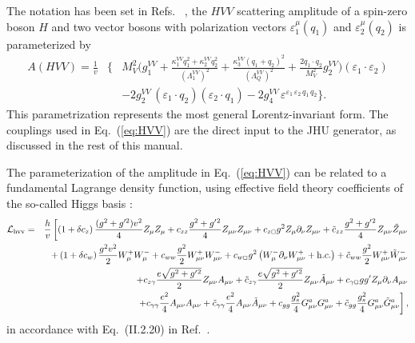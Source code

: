 \documentclass[aps,superscriptaddress,nofootinbib]{revtex4}
\begin{document}
The notation has been set in Refs.~\cite{Gao:2010qx,Bolognesi:2012,Anderson:2013,Gritsan:2016} ,
the $HVV$ scattering amplitude of a spin-zero boson $H$ and two vector bosons with polarization vectors 
$\varepsilon_{1}^\mu(q_1)$ and $\varepsilon_{2}^\mu(q_2)$
is parameterized by
\begin{eqnarray}
  A({H V V}) \!=\! \frac{1}{v} &\bigg\{  &
                          M_V^2 \bigg(g_{1}^{VV} 
+ \frac{\kappa_1^{VV}q_{1}^2 + \kappa_2^{VV} q_{2}^{2}}{\left(\Lambda_{1}^{VV} \right)^{2}} + \frac{\kappa_3^{VV} (q_1+q_2)^2}{\left(\Lambda_{Q}^{VV} \right)^{2}} 
+ \frac{2 q_1\cdot q_2}{M_V^2} g_2^{VV}\bigg) (\varepsilon_1 \cdot \varepsilon_2) 
\nonumber \\ &&
                        -2 g_2^{VV} \, {(\varepsilon_1 \cdot q_2)(\varepsilon_2 \cdot q_1)}
                        -2  g_4^{VV} \, {\varepsilon^{\varepsilon_1\,\varepsilon_2\,q_1\,q_2}}
                               \bigg\}.
\label{eq:HVV}
\end{eqnarray}
This parametrization represents the most general Lorentz-invariant form. 
The couplings used in Eq.~(\ref{eq:HVV}) are the direct input to the JHU generator, as discussed
in the rest of this manual. 

The parameterization of the amplitude in Eq.~(\ref{eq:HVV}) can be related to a fundamental Lagrange density function,
using effective field theory coefficients of the so-called Higgs basis \cite{deFlorian:2016spz}:
\begin{eqnarray}
\label{eq:EFT_hvv}
 {\cal L}_{\rm hvv} =& & {h \over v} \left [ 
  \left (1 +  \delta c_z \right )  {(g^2+g^{\prime 2}) v^2 \over 4} Z_\mu Z_\mu
+ c_{zz} {g^2 + g'{}^2 \over  4} Z_{\mu \nu} Z_{\mu\nu}  
+c_{z \Box} g^2 Z_\mu \partial_\nu Z_{\mu \nu}
+ \tilde c_{zz}  {g^2 + g'{}^2  \over  4} Z_{\mu \nu} \tilde Z_{\mu\nu}
\right . \nonumber \\ & & \left . 
% 
% 
 +\left (1 +  \delta c_w \right )  {g^2 v^2 \over 2} W_\mu^+ W_\mu^- 
+ c_{ww}  {g^2 \over  2} W_{\mu \nu}^+  W_{\mu\nu}^- 
+ c_{w \Box} g^2 \left (W_\mu^- \partial_\nu W_{\mu \nu}^+ + {\mathrm h.c.} \right )  
 + \tilde c_{ww}  {g^2 \over  2} W_{\mu \nu}^+   \tilde W_{\mu\nu}^- 
 \right . \nonumber \\ & & \left . 
% 
% 
+ c_{z \gamma} {e \sqrt{g^2 + g'{}^2}  \over  2} Z_{\mu \nu} A_{\mu\nu} 
+ \tilde c_{z \gamma} {e \sqrt{g^2 + g'{}^2} \over  2} Z_{\mu \nu} \tilde A_{\mu\nu}
+ c_{\gamma \Box} g g' Z_\mu \partial_\nu A_{\mu \nu}
\right . \nonumber \\ & & \left . 
% 
% 
+ c_{\gamma \gamma} {e^2 \over 4} A_{\mu \nu} A_{\mu \nu} 
+ \tilde c_{\gamma \gamma} {e^2 \over 4} A_{\mu \nu} \tilde A_{\mu \nu} 
+  c_{gg} {g_s^2 \over 4 } G_{\mu \nu}^a G_{\mu \nu}^a   
+  \tilde c_{gg} {g_s^2 \over 4} G_{\mu \nu}^a \tilde G_{\mu \nu}^a  
\right ],
\end{eqnarray} 
in accordance with Eq.~(II.2.20) in Ref.~\cite{deFlorian:2016spz}.
\end{document}
